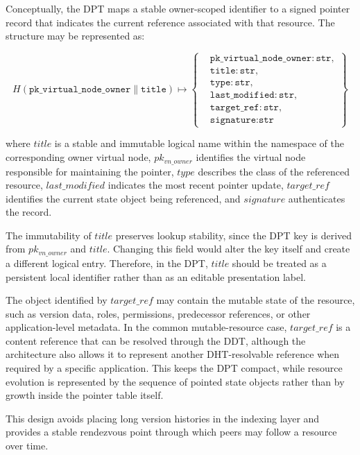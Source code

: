 \documentclass[12pt,a4paper]{article}
\begin{document}
Conceptually, the DPT maps a stable owner-scoped identifier to a signed pointer record that indicates the current reference associated with that resource. The structure may be represented as:

\[
H(\texttt{pk\_virtual\_node\_owner} \parallel \texttt{title}) \mapsto
\left\{
\begin{aligned}
&\texttt{pk\_virtual\_node\_owner}: \texttt{str},\\
&\texttt{title}: \texttt{str},\\
&\texttt{type}: \texttt{str},\\
&\texttt{last\_modified}: \texttt{str},\\
&\texttt{target\_ref}: \texttt{str},\\
&\texttt{signature}: \texttt{str}
\end{aligned}
\right\}
\]

where \(title\) is a stable and immutable logical name within the namespace of the corresponding owner virtual node, \(pk_{vn\_owner}\) identifies the virtual node responsible for maintaining the pointer, \(type\) describes the class of the referenced resource, \(last\_modified\) indicates the most recent pointer update, \(target\_ref\) identifies the current state object being referenced, and \(signature\) authenticates the record.

The immutability of \(title\) preserves lookup stability, since the DPT key is derived from \(pk_{vn\_owner}\) and \(title\). Changing this field would alter the key itself and create a different logical entry. Therefore, in the DPT, \(title\) should be treated as a persistent local identifier rather than as an editable presentation label.

The object identified by \(target\_ref\) may contain the mutable state of the resource, such as version data, roles, permissions, predecessor references, or other application-level metadata. In the common mutable-resource case, \(target\_ref\) is a content reference that can be resolved through the DDT, although the architecture also allows it to represent another DHT-resolvable reference when required by a specific application. This keeps the DPT compact, while resource evolution is represented by the sequence of pointed state objects rather than by growth inside the pointer table itself.

This design avoids placing long version histories in the indexing layer and provides a stable rendezvous point through which peers may follow a resource over time.
\end{document}
